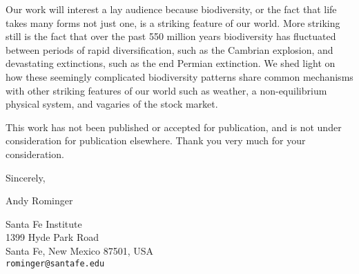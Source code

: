 \documentclass[12pt]{article}
\begin{document}
Our work will interest a lay audience because biodiversity, or the
fact that life takes many forms not just one, is a striking feature of
our world. More striking still is the fact that over the past 550
million years biodiversity has fluctuated between periods of rapid
diversification, such as the Cambrian explosion, and devastating
extinctions, such as the end Permian extinction.  We shed light on how
these seemingly complicated biodiversity patterns share common
mechanisms with other striking features of our world such as weather,
a non-equilibrium physical system, and vagaries of the stock market.

This work has not been published or accepted for publication, and is
not under consideration for publication elsewhere. Thank you very much
for your consideration.
\vspace{2em}

\noindent
Sincerely,
\vspace{2em}

\noindent
Andy Rominger

\noindent
Santa Fe Institute \\
1399 Hyde Park Road \\
Santa Fe, New Mexico 87501, USA \\
{\tt rominger@santafe.edu}

\printbibliography
\end{document}
